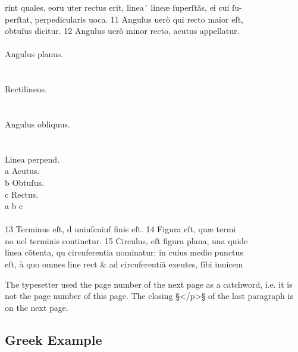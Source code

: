 \begin{typeLatin}
rint quales, eor\bs\tld{}u uter rectus erit, linea´ lineæ ſuperſtãs, ei cui ſu-\\
perſtat, perp\bs\tld{}edicularis uoca. 11 Angulus uerò qui recto maior eſt,\\
obtuſus dicitur. 12 Angulus uerò minor recto, acutus appellatur.\\
\\
\bold{_}A\bold{_}ngulus planus.\\
\\
\\
\bold{_}R\bold{_}ectilineus.\\
\\
\\
\bold{_}A\bold{_}ngulus obliquus.\\
\\
\\
Linea perpend.\\
a Acutus.\\
b Obtuſus.\\
c Rectus.\\
a b c\\
\\
13 Terminus eſt, d uniuſcuiuſ finis eſt. 14 Figura eſt, quæ termi\\
no uel terminis continetur. 15 Circulus, eſt figura plana, una quid\bs\tld{}e\\
linea cõtenta, qu circ\bs\tld{}uferentia nominatur: in cuius medio punctus\\
eſt, à quo omnes line rect & ad circ\bs\tld{}uferentiã exe\bs\tld{}utes, ſibi inuicem\\
\end{typeLatin}

\begin{note}
The typesetter used the page number of the next page as a catchword, i.e. it is not the page number of this page. The closing §</p>§ of the last paragraph is on the next page.
\end{note}

\vfill


\tocspace
\subsection{Greek Example}
\label{section greek example}

